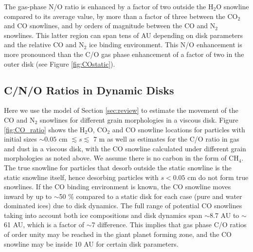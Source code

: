\documentclass[apj]{emulateapj}
\begin{document}
The gas-phase N/O ratio is enhanced by a factor of two outside the H$_2$O snowline compared to its average value, by more than a factor of three between the CO$_2$ and CO snowlines, and by orders of magnitude between the CO and N$_2$ snowlines. This latter region can span tens of AU depending on disk parameters and the relative CO and N$_2$ ice binding environment. This N/O  enhancement is more pronounced than the C/O gas phase enhancement of a factor of two in the outer disk (see Figure \ref{fig:COstatic}). %

\subsection{C/N/O Ratios in Dynamic Disks}
\label{sec:dynamic}



Here we use the model of Section \ref{sec:review} to estimate the movement of the CO and N$_2$ snowlines for different grain morphologies in a viscous disk. Figure \ref{fig:CO_ratio} shows the H$_2$O, CO$_2$ and CO snowline locations for particles with initial sizes $\sim0.05$ cm $\lesssim s \lesssim$ 7 m as well as estimates for the C/O ratio in gas and dust in a viscous disk, with the CO snowline calculated under different grain morphologies as noted above. We assume there is no carbon in the form of CH$_4$. The true snowline for particles that desorb outside the static snowline is the static snowline itself, hence desorbing particles with $s<0.05$ cm do not form true snowlines. If the CO binding environment is known, the CO snowline moves inward by up to $\sim$50 \% compared to a static disk for each case (pure and water dominated ices) due to disk dynamics. The full range of potential CO snowlines taking into account both ice compositions and disk dynamics span $\sim$8.7 AU to $\sim$61 AU, which is a factor of $\sim$7 difference. This implies that gas phase C/O ratios of order unity may be reached in the giant planet forming zone, and the CO snowline may be inside 10 AU for certain disk parameters.  
\end{document}

